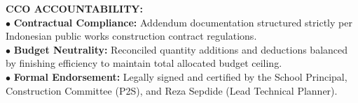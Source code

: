 \documentclass[10pt,a4paper,landscape]{article}
\begin{document}
\begin{minipage}[t]{0.30\linewidth}
  \begin{tcolorbox}[sharp corners, boxrule=0.6pt, colframe=pnavy, colback=pbglight, left=2.5mm, right=2.5mm, top=2mm, bottom=2mm, height=54mm]
    {\fontsize{7pt}{8.5pt}\selectfont\bfseries\color{pnavy}CCO ACCOUNTABILITY:}\\[1.5mm]
    {\fontsize{6.5pt}{8.2pt}\selectfont\color{psteel}
    $\bullet$ \textbf{Contractual Compliance:} Addendum documentation structured strictly per Indonesian public works construction contract regulations.\\
    $\bullet$ \textbf{Budget Neutrality:} Reconciled quantity additions and deductions balanced by finishing efficiency to maintain total allocated budget ceiling.\\
    $\bullet$ \textbf{Formal Endorsement:} Legally signed and certified by the School Principal, Construction Committee (P2S), and Reza Sepdide (Lead Technical Planner).
    }
  \end{tcolorbox}
\end{minipage}%
\hfill
\end{document}
